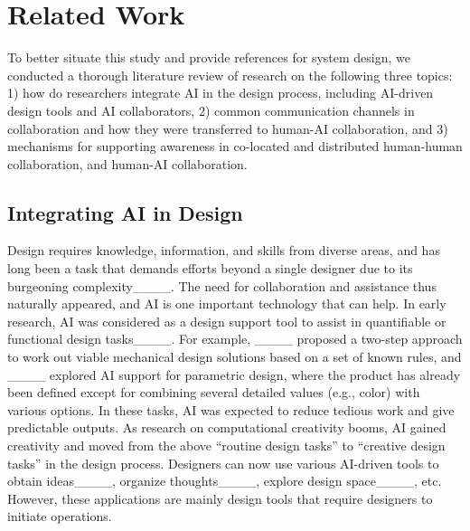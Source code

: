 \section{Related Work}
To better situate this study and provide references for system design, we conducted a thorough literature review of research on the following three topics: 1) how do researchers integrate AI in the design process, including AI-driven design tools and AI collaborators, 2) common communication channels in collaboration and how they were transferred to human-AI collaboration, and 3) mechanisms for supporting awareness in co-located and distributed human-human collaboration, and human-AI collaboration.

\subsection{Integrating AI in Design}
Design requires knowledge, information, and skills from diverse areas, and has long been a task that demands efforts beyond a single designer due to its burgeoning complexity____. The need for collaboration and assistance thus naturally appeared, and AI is one important technology that can help. In early research, AI was considered as a design support tool to assist in quantifiable or functional design tasks____. For example, ____ proposed a two-step approach to work out viable mechanical design solutions based on a set of known rules, and ____ explored AI support for parametric design, where the product has already been defined except for combining several detailed values (e.g., color) with various options. In these tasks, AI was expected to reduce tedious work and give predictable outputs. As research on computational creativity booms, AI gained creativity and moved from the above ``routine design tasks'' to ``creative design tasks'' in the design process. Designers can now use various AI-driven tools to obtain ideas____, organize thoughts____, explore design space____, etc. However, these applications are mainly design tools that require designers to initiate operations.

